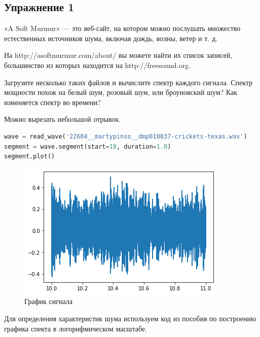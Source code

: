 \subsection{Упражнение 1}

«A Soft Murmur» — это веб-сайт, на котором можно послушать множество естественных источников шума, включая дождь, волны, ветер и т. д. 

\noindent На http://asoftmurmur.com/about/ вы можете найти их список записей, большинство из которых находится на http://freesound.org.

\noindent Загрузите несколько таких файлов и вычислите спектр каждого сигнала. Спектр мощности похож на белый шум, розовый шум, или броуновский шум? Как изменяется спектр во времени?

Можно вырезать небольшой отрывок.

\begin{lstlisting}[language=Python]
wave = read_wave('22604__martypinso__dmp010037-crickets-texas.wav')
segment = wave.segment(start=10, duration=1.0)
segment.plot()
\end{lstlisting}
\begin{figure}[H]
	\begin{center}
		\includegraphics[scale=1]{fig/lab04/lab04_7_0.png}
		\caption{График сигнала}
	\end{center}
\end{figure}

Для определения характеристик шума используем код из пособия по построению графика спекта в логорифмическом масштабе.

